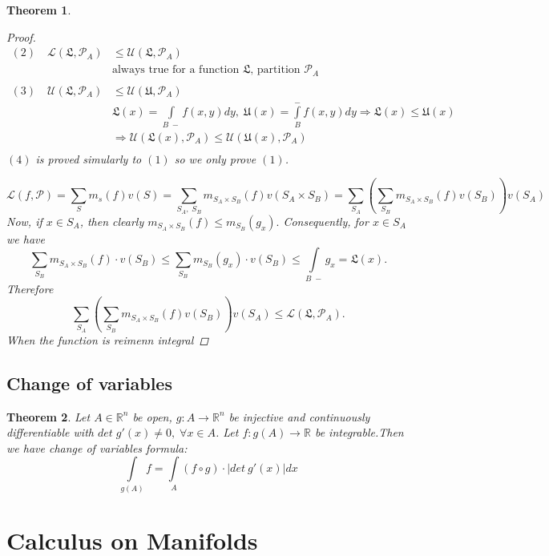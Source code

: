 \documentclass[12pt]{article}
\def\RR{\mathbb{R}}
\newtheorem{theorem}{Theorem}[section]
\begin{document}
\begin{theorem}
\begin{proof}
\begin{align*}
(2) \quad \mathcal{L}(\mathfrak{L},\mathcal{P}_A) &\leq \mathcal{U}(\mathfrak{L},\mathcal{P}_A) \\ &\text{always true for  a function $\mathfrak{L}$, partition $\mathcal{P}_A$} \\ \;& \; \\
(3) \quad \mathcal{U}(\mathfrak{L},\mathcal{P}_A) &\leq \mathcal{U}(\mathfrak{U},\mathcal{P}_A)\\
&\mathfrak{L}(x)  =\int\limits_{B \;-}f(x,y)dy, \; \mathfrak{U}(x)  =\int\limits_{B}^{-}f(x,y)dy \Rightarrow \mathfrak{L}(x) \leq \mathfrak{U}(x) \\
 &\Rightarrow \mathcal{U}(\mathfrak{L}(x), \mathcal{P}_A) \leq \mathcal{U}(\mathfrak{U}(x), \mathcal{P}_A) \\
\end{align*}
$(4)$ is proved simularly to $(1)$ so we only prove $(1)$. 

\[\mathcal{L}(f,\mathcal{P})= \sum_{S}m_{s}(f) v(S) = \sum_{S_A, \; S_B}\! m_{S_A \times S_B}(f)  v(S_A \times S_B) = \sum_{S_A}\left(\sum_{S_B} m_{S_A \times S_B}(f)  v(S_B) \right)\! v(S_A)\]
Now, if $x \in S_A$, then clearly $m_{S_A \times S_B}(f) \leq m_{S_B}(g_x).$ Consequently, for $x \in S_A$ we have
\[\sum_{S_B} m_{S_A \times S_B}(f) \cdot v(S_B) \leq \sum_{S_B}m_{S_B}(g_x)\cdot v(S_B) \leq \int\limits_{B \;-}g_x = \mathfrak{L}(x).\]
Therefore
\[\sum_{S_A}\left(\sum_{S_B} m_{S_A \times S_B}(f)  v(S_B) \right)\! v(S_A) \leq \mathcal{L}(\mathfrak{L}, \mathcal{P}_A).\]
When the function is reimenn integral
\end{proof}
\end{theorem}

\subsection{Change of variables}
\begin{theorem}
Let $A \in \RR^n$ be open, $g:A \rightarrow \RR^n$ be injective and continuously differentiable with $det \;g'(x) \neq 0, \; \forall x \in A$. Let $f:g(A) \rightarrow \RR$ be integrable.Then we have change of variables formula:
\[\int\limits_{g(A)}\!f=\int\limits_{A}(f \circ g)\cdot |det \:g'(x)|dx\]
\end{theorem}

\section{Calculus on Manifolds}
\end{document}
